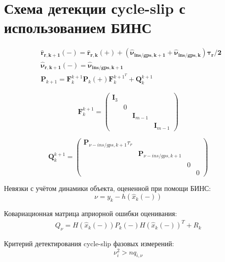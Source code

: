 \documentclass[aspectratio=43,display]{beamer}
\begin{document}
\section{Схема детекции сycle-slip с использованием БИНС}
\begin{frame}
	
\vspace{0.25 cm}
	
	\begin{equation}
		\label{eq:ins_22}
		\begin{split}
			& \bm { \hat{r}_{r,k+1}(-) = \hat{r}_{r,k}(+) + (\hat{\nu}_{ins/gps,k+1} + \hat{\nu}_{ins/gps,k})\tau_r/2 } \\
			& \bm{ \hat{\nu}_{r,k+1}(-) = \hat{\nu}_{ins/gps,k+1} }\\
			& \bm{P}_{k+1} = \bm{F}_k^{k+1} \bm{P}_k(+) \bm{F}_k^{k+1^T} + \bm{Q}_k^{k+1}
		\end{split}
	\end{equation}
	
	\begin{equation*}
		\label{eq:F_k}
		\bm{F}_k^{k+1} = 
		\begin{pmatrix}
			\bm{I}_3 & & & \\
			& 0 & & \\
			& & \bm{I}_{m-1} & \\
			& & & \bm{I}_{m-1}
		\end{pmatrix}
	\end{equation*}
	
	\begin{equation*}
		\label{eq:Q_k}
		\bm{Q}_k^{k+1} = 
		\begin{pmatrix}
			\bm{P}_{\nu-ins/gps,k+1} \tau_r & & & \\
			& \bm{P}_{\nu-ins/gps,k+1}  & & \\
			& & 0 & \\
			& & & 0
		\end{pmatrix}
	\end{equation*}	
\end{frame}


\begin{fleqn}
\begin{frame}
	
	Невязки с учётом динамики объекта, оцененной при помощи БИНС:
	\begin{equation}
		\label{eq:ins_23.1}
			\nu = y_k - h(\hat{x}_k(-))			
	\end{equation}
	
	Ковариационная матрица априорной ошибки оценивания: 
	\begin{equation}
		\label{eq:ins_23.2}
		\begin{split}
			Q_{\nu} = H(\hat{x}_k(-))P_k(-)H(\hat{x}_k(-))^T + R_k
		\end{split}
	\end{equation}
	
	Критерий детектирования cycle-slip фазовых измерений: 
	\begin{equation}
		\label{eq:ins_24}
		\nu_i^2 > nq_{i, \nu}
	\end{equation}
\end{frame}
\end{fleqn}
\end{document}
